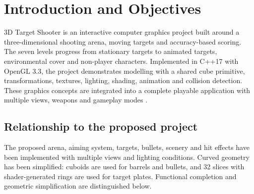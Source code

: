 \section{Introduction and Objectives}
3D Target Shooter is an interactive computer graphics project built around a three-dimensional shooting arena, moving targets and accuracy-based scoring. The seven levels progress from stationary targets to animated targets, environmental cover and non-player characters. Implemented in C++17 with OpenGL 3.3, the project demonstrates modelling with a shared cube primitive, transformations, textures, lighting, shading, animation and collision detection. These graphics concepts are integrated into a complete playable application with multiple views, weapons and gameplay modes \cite{project}.
\subsection{Relationship to the proposed project}
The proposed arena, aiming system, targets, bullets, scenery and hit effects have been implemented with multiple views and lighting conditions. Curved geometry has been simplified: cuboids are used for barrels and bullets, and 32 slices with shader-generated rings are used for target plates. Functional completion and geometric simplification are distinguished below.
